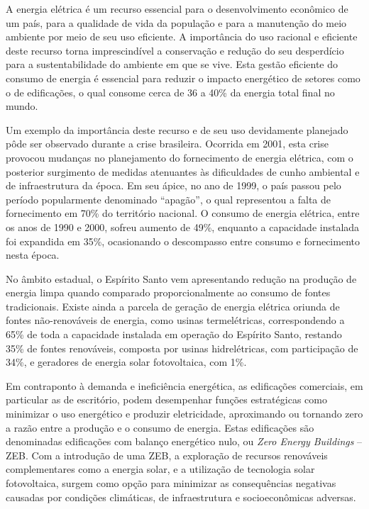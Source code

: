 \begin{onehalfspace}
\footnotesize
    \noindent A energia elétrica é um recurso essencial para o desenvolvimento econômico de 
    um país, para a qualidade de vida da população e para a manutenção do meio ambiente
    por meio de seu uso eficiente. A importância do uso racional e eficiente deste
    recurso torna imprescindível a conservação e redução do seu desperdício para a 
    sustentabilidade do ambiente em que se vive. Esta gestão eficiente do consumo de energia
    é essencial para reduzir o impacto energético de setores como o de edificações, 
    o qual consome cerca de 36 a 40\% da energia total final no mundo.\vspace*{0.3cm}
    
    \noindent Um exemplo da importância deste recurso e de seu uso devidamente planejado 
    pôde ser observado durante a crise brasileira. Ocorrida em 2001, esta crise provocou 
    mudanças no planejamento do fornecimento de energia elétrica, com o posterior 
    surgimento de medidas atenuantes às dificuldades de cunho ambiental e de 
    infraestrutura da época. Em seu ápice, no ano de 1999, o país passou pelo período 
    popularmente denominado “apagão”, o qual representou a falta de fornecimento 
    em 70\% do território nacional. O consumo de energia elétrica, entre os anos 
    de 1990 e 2000, sofreu aumento de 49\%, enquanto a capacidade instalada foi 
    expandida em 35\%, ocasionando o descompasso entre consumo e fornecimento 
    nesta época.\vspace*{0.3cm}

    \noindent No âmbito estadual, o Espírito Santo vem apresentando redução na produção 
    de energia limpa quando comparado proporcionalmente ao consumo de fontes tradicionais. 
    Existe ainda a parcela de geração de energia elétrica oriunda de fontes não-renováveis 
    de energia, como usinas termelétricas, correspondendo a 65\% de toda a capacidade 
    instalada em operação do Espírito Santo, restando 35\% de fontes renováveis, composta 
    por usinas hidrelétricas, com participação de 34\%, e geradores de energia solar 
    fotovoltaica, com 1\%.\vspace*{0.3cm}

    \noindent Em contraponto à demanda e ineficiência energética, as edificações
    comerciais, em particular as de escritório, podem desempenhar funções estratégicas 
    como minimizar o uso energético e produzir eletricidade, aproximando ou tornando 
    zero a razão entre a produção e o consumo de energia. Estas edificações são 
    denominadas edificações com balanço energético nulo, 
    ou \textit{Zero Energy Buildings} – ZEB.
    Com a introdução de uma ZEB, a exploração de recursos renováveis complementares 
    como a energia solar, e a utilização de tecnologia solar fotovoltaica, surgem como 
    opção para minimizar as consequências negativas causadas por condições climáticas, 
    de infraestrutura e socioeconômicas adversas.\vspace*{0.3cm}


\end{onehalfspace}
